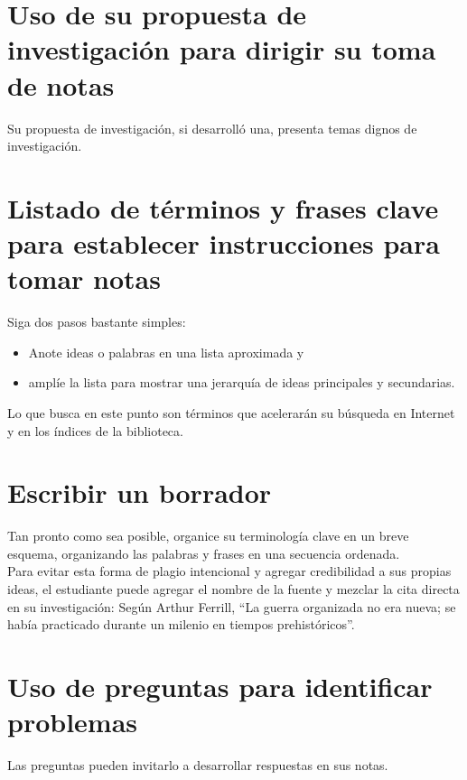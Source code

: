 \section{Uso de su propuesta de investigación para dirigir su toma de notas}
Su propuesta de investigación, si desarrolló una, presenta temas dignos de investigación.

\section{Listado de términos y frases clave para establecer instrucciones para tomar notas}
Siga dos pasos bastante simples: 
\begin{itemize}
    \item Anote ideas o palabras en una lista aproximada y 
    \item amplíe la lista para mostrar una jerarquía de ideas principales y secundarias.
\end{itemize}
Lo que busca en este punto son términos que acelerarán su búsqueda en Internet y en los índices de la biblioteca.

\section{Escribir un borrador}
Tan pronto como sea posible, organice su terminología clave en un breve esquema, organizando las palabras y frases en una secuencia ordenada.\\

Para evitar esta forma de plagio intencional y agregar credibilidad a sus propias ideas, el estudiante puede agregar el nombre de la fuente y mezclar la cita directa en su investigación: Según Arthur Ferrill, “La guerra organizada no era nueva; se había practicado durante un milenio en tiempos prehistóricos”.

\section{Uso de preguntas para identificar problemas}
Las preguntas pueden invitarlo a desarrollar respuestas en sus notas.

